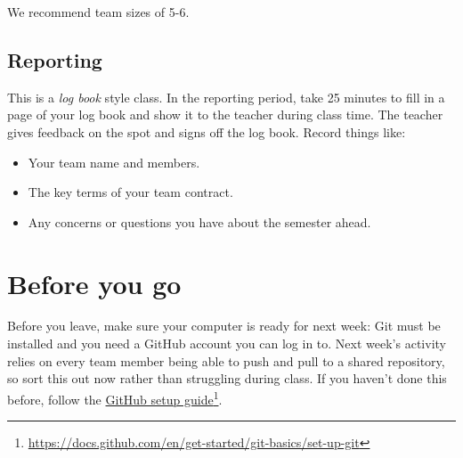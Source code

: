 \documentclass[twoside=false,DIV=14]{scrartcl}
\begin{document}
We recommend team sizes of 5-6.

\subsection*{Reporting}

This is a \emph{log book} style class.  In the reporting period, take 25 minutes to fill in a page of your log book and show it to the teacher during class time.  The teacher gives feedback on the spot and signs off the log book.  Record things like:
\begin{itemize}
\itemsep0em
\item Your team name and members.
\item The key terms of your team contract.
\item Any concerns or questions you have about the semester ahead.
\end{itemize}

\section*{Before you go}

Before you leave, make sure your computer is ready for next week: Git must be installed and you need a GitHub account you can log in to.  Next week's activity relies on every team member being able to push and pull to a shared repository, so sort this out now rather than struggling during class.  If you haven't done this before, follow the \href{https://docs.github.com/en/get-started/git-basics/set-up-git}{GitHub setup guide}\footnote{\url{https://docs.github.com/en/get-started/git-basics/set-up-git}}.
\end{document}
